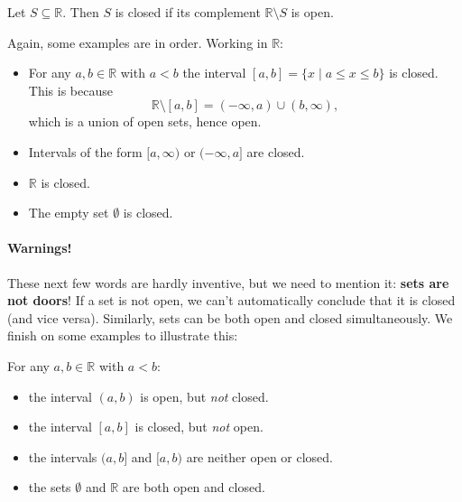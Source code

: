 \documentclass[
  10pt,
  a4paper]{article}
\providecommand{\tightlist}{%
  \setlength{\itemsep}{0pt}\setlength{\parskip}{0pt}}
\theoremstyle{plain}
\theoremstyle{plain}
\theoremstyle{plain}
\theoremstyle{plain}
\theoremstyle{plain}
\theoremstyle{definition}
\theoremstyle{definition}
\theoremstyle{definition}
\theoremstyle{remark}
\let\BeginKnitrBlock\begin \let\EndKnitrBlock\end
\begin{document}
\BeginKnitrBlock{definition}[Closed Set]
{\label{def:def5} }Let \(S \subseteq \mathbb{R}\). Then \(S\) is closed if its complement \(\mathbb{R}\setminus S\) is open.
\EndKnitrBlock{definition}
Again, some examples are in order. Working in \(\mathbb{R}\):

\begin{itemize}
\tightlist
\item
  For any \(a,b \in \mathbb{R}\) with \(a < b\) the interval \([a,b] = \lbrace x \;\lvert\; a \leq x \leq b \rbrace\) is closed. This is because \[\mathbb{R}\setminus[a,b] = (-\infty,a)\cup(b,\infty),\] which is a union of open sets, hence open.
\item
  Intervals of the form \([a, \infty)\) or \((-\infty, a]\) are closed.
\item
  \(\mathbb{R}\) is closed.
\item
  The empty set \(\emptyset\) is closed.
\end{itemize}

\hypertarget{warnings}{%
\paragraph*{Warnings!}\label{warnings}}

These next few words are hardly inventive, but we need to mention it: \textbf{sets are not doors}! If a set is not open, we can't automatically conclude that it is closed (and vice versa). Similarly, sets can be both open and closed simultaneously. We finish on some examples to illustrate this:

For any \(a,b \in \mathbb{R}\) with \(a < b\):

\begin{itemize}
\tightlist
\item
  the interval \((a,b)\) is open, but \emph{not} closed.
\item
  the interval \([a,b]\) is closed, but \emph{not} open.
\item
  the intervals \((a,b]\) and \([a,b)\) are neither open or closed.
\item
  the sets \(\emptyset\) and \(\mathbb{R}\) are both open and closed.
\end{itemize}
\end{document}
